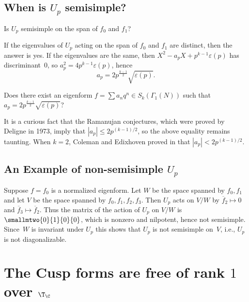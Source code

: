 \documentclass{report}
\begin{document}
\subsection{When is $U_p$ semisimple?}
\begin{question}
Is $U_p$ semisimple on the span of $f_0$ and $f_1$?
\end{question}

If the eigenvalues of $U_p$ acting on the span of $f_0$ and $f_1$ are
distinct, then the answer is yes.  If the eigenvalues are the same,
then $X^2-a_p X+p^{k-1}\varepsilon(p)$ has discriminant~$0$, so
$a_p^2=4p^{k-1}\varepsilon(p)$, hence
\[
 a_p=2p^{\frac{k-1}{2}}\sqrt{\varepsilon(p)}.
\]
\begin{openproblem}
Does there exist an eigenform $f=\sum a_n q^n \in
S_k(\Gamma_1(N))$ such that $a_p
=2p^{\frac{k-1}{2}}\sqrt{\varepsilon(p)}$?
\end{openproblem}

It is a curious fact that the Ramanujan conjectures, which were proved
by Deligne in 1973, imply that $|a_p|\leq 2p^{(k-1)/2}$, so the above
equality remains taunting. When $k=2$, Coleman and Edixhoven proved in
\cite{coleman-edixhoven} that $|a_p|<2p^{(k-1)/2}$.


\subsection{An Example of non-semisimple $U_p$}\label{sec:nondiag}
Suppose $f=f_0$ is a normalized eigenform.  Let $W$ be the space
spanned by $f_0, f_1$ and let $V$ be the space spanned by $f_0,
f_1, f_2, f_3$. Then $U_p$ acts on $V/W$ by $\overline{f}_2\mapsto 0$
and $\overline{f}_3\mapsto \overline{f}_2$. Thus the matrix of the
action of $U_p$ on $V/W$ is $\smallmtwo{0}{1}{0}{0}$, which is
nonzero and nilpotent, hence not semisimple. Since~$W$ is
invariant under $U_p$ this shows that $U_p$ is not semisimple
on~$V$, i.e., $U_p$ is not diagonalizable.

\section{The Cusp forms are free of rank $1$ over $\T_\C$}
\end{document}
